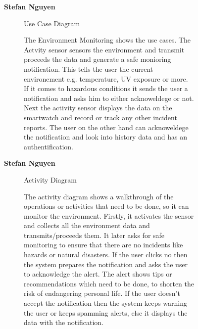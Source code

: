 \documentclass{article}
\begin{document}
		\clearpage
	\begin{figure}[htbp]
		\textbf{Stefan Nguyen}
		\centering
		\begin{subfigure}{\textwidth}
			\resizebox{\textwidth}{!}{}
			\caption{Use Case Diagram}
		\end{subfigure}
		\begin{subfigure}{\textwidth}
			The Environment Monitoring shows the use cases. The Actvity sensor sensors the environment and transmit
			proceeds the data and generate a safe monioring notification. This tells the user the current environement e.g.
			temperature, UV exposure or more. If it comes to hazardous conditions it sends the user a notification and asks him 
			to either acknoweldege or not. Next the activity sensor displays the data on the smartwatch and record or
			track any other incident reports. The user on the other hand can acknoweldege the notification and look into
			history data and has an authentification. 
		\end{subfigure}
	\end{figure}
	\clearpage

	\begin{figure}[htbp]
		\textbf{Stefan Nguyen}
		\centering
		\begin{subfigure}{\textwidth}
			\resizebox{\textwidth}{!}{}
			\caption{Activity Diagram}
		\end{subfigure}
		\begin{subfigure}{\textwidth}
			The activity diagram shows a walkthrough of the operations or activities that need to be done, 
			so it can monitor the environment. Firstly, it activates the sensor and collects all the environment 
			data and transmits/proceeds them. It later asks for safe monitoring to ensure that there are no incidents 
			like hazards or natural disasters. If the user clicks no then the system prepares the notification and 
			asks the user to acknowledge the alert. The alert shows tips or recommendations which need to be done, to 
			shorten the risk of endangering personal life. If the user doesn’t accept the notification then the system 
			keeps warning the user or keeps spamming alerts, else it displays the data with the notification.
		\end{subfigure}
	\end{figure}
	
\end{document}
